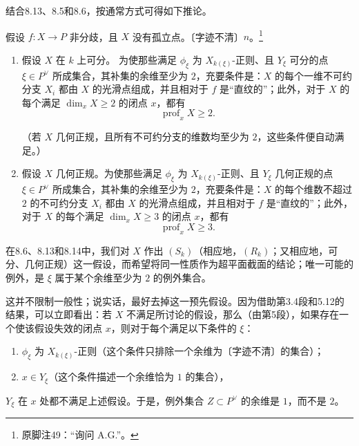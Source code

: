 结合8.13、8.5和8.6，按通常方式可得如下推论。

假设 $f\colon X\to P$ 非分歧，且 $X$ 没有孤立点。〔字迹不清〕$n$。\footnote{原脚注49：“询问 A.G.”。}
\begin{enumerate}
\item[(a)] 假设 $X$ 在 $k$ 上可分。
为使那些满足 $\phi_\xi$ 为 $X_{k(\xi)}$-正则、且 $Y_\xi$ 可分的点 $\xi\in P^\vee$ 所成集合，其补集的余维至少为 $2$，充要条件是：$X$ 的每个一维不可约分支 $X_i$ 都由 $X$ 的光滑点组成，并且相对于 $f$ 是“直纹的”；此外，对于 $X$ 的每个满足 $\dim_x X\ge2$ 的闭点 $x$，都有
\[
\operatorname{prof}_x X\ge2.
\]

（若 $X$ 几何正规，且所有不可约分支的维数均至少为 $2$，这些条件便自动满足。）
\item[(b)] 假设 $X$ 几何正规。为使那些满足 $\phi_\xi$ 为 $X_{k(\xi)}$-正则、且 $Y_\xi$ 几何正规的点 $\xi\in P^\vee$ 所成集合，其补集的余维至少为 $2$，充要条件是：$X$ 的每个维数不超过 $2$ 的不可约分支 $X_i$ 都由 $X$ 的光滑点组成，并且相对于 $f$ 是“直纹的”；此外，对于 $X$ 的每个满足 $\dim_x X\ge3$ 的闭点 $x$，都有
\[
\operatorname{prof}_x X\ge3.
\]
\end{enumerate}

在8.6、8.13和8.14中，我们对 $X$ 作出 $(S_k)$（相应地，$(R_k)$；又相应地，可分、几何正规）这一假设，而希望将同一性质作为超平面截面的结论；唯一可能的例外，是 $\xi$ 属于某个余维至少为 $2$ 的例外集合。

这并不限制一般性；说实话，最好去掉这一预先假设。因为借助第3.4段和5.12的结果，可以立即看出：若 $X$ 不满足所讨论的假设，那么（由第5段），如果存在一个使该假设失效的闭点 $x$，则对于每个满足以下条件的 $\xi$：
\begin{enumerate}
\item $\phi_\xi$ 为 $X_{k(\xi)}$-正则（这个条件只排除一个余维为〔字迹不清〕的集合）；
\item $x\in Y_\xi$（这个条件描述一个余维恰为 $1$ 的集合），
\end{enumerate}
$Y_\xi$ 在 $x$ 处都不满足上述假设。于是，例外集合 $Z\subset P^\vee$ 的余维是 $1$，而不是 $2$。

